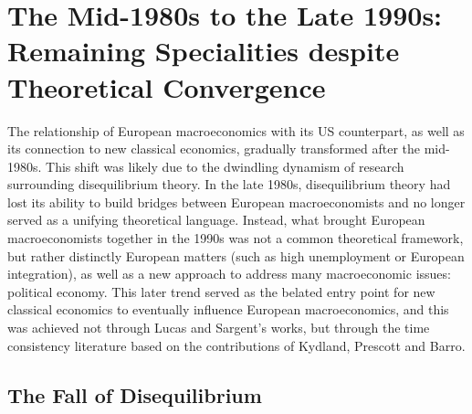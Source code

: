\documentclass[
  12pt,
  onecolumn]{article}
\begin{document}
\hypertarget{the-mid-1980s-to-the-late-1990s-remaining-specialities-despite-theoretical-convergence}{%
\section{The Mid-1980s to the Late 1990s: Remaining Specialities despite
Theoretical
Convergence}\label{the-mid-1980s-to-the-late-1990s-remaining-specialities-despite-theoretical-convergence}}

The relationship of European macroeconomics with its US counterpart, as
well as its connection to new classical economics, gradually transformed
after the mid-1980s. This shift was likely due to the dwindling dynamism
of research surrounding disequilibrium theory. In the late 1980s,
disequilibrium theory had lost its ability to build bridges between
European macroeconomists and no longer served as a unifying theoretical
language. Instead, what brought European macroeconomists together in the
1990s was not a common theoretical framework, but rather distinctly
European matters (such as high unemployment or European integration), as
well as a new approach to address many macroeconomic issues: political
economy. This later trend served as the belated entry point for new
classical economics to eventually influence European macroeconomics, and
this was achieved not through Lucas and Sargent's works, but through the
time consistency literature based on the contributions of Kydland,
Prescott and Barro.

\hypertarget{the-fall-of-disequilibrium}{%
\subsection{The Fall of
Disequilibrium}\label{the-fall-of-disequilibrium}}
\end{document}
